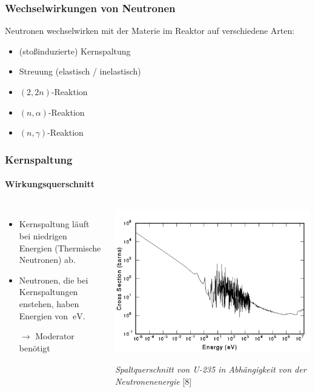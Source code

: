 \documentclass{beamer}[9pt]
\begin{document}
\begin{frame}
\frametitle{Wechselwirkungen von Neutronen}
Neutronen wechselwirken mit der Materie im Reaktor auf verschiedene Arten:
\begin{itemize}
\item (stoßinduzierte) Kernspaltung
\item Streuung (elastisch / inelastisch)
\item $(2, 2n)$-Reaktion 
\item $(n,\alpha)$-Reaktion 
\item $(n,\gamma)$-Reaktion

\end{itemize}
\end{frame}



\begin{frame}
\frametitle{Kernspaltung}
\framesubtitle{Wirkungsquerschnitt}
\begin{columns}
\begin{itemize}
\item Kernspaltung läuft bei niedrigen Energien (Thermische Neutronen) ab.
\item Neutronen, die bei Kernspaltungen enstehen, haben Energien von $\SI{}{\eV}$.
\item [$\rightarrow$] Moderator benötigt
\end{itemize}
\begin{center}
\vspace{-.6cm}
\includegraphics[scale=0.25]{u235_fission_cs.pdf}

\textit{Spaltquerschnitt von U-235 in Abhängigkeit von der Neutronenenergie} [8]

\end{center}
\end{columns}
\end{frame}
\end{document}
